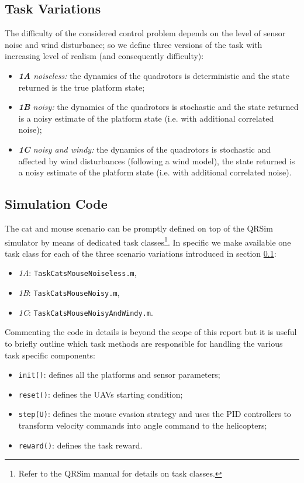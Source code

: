 \documentclass[a4paper,11pt]{report}
\newcommand{\sname}{QRSim\xspace}
\newcommand\mytexttt[1]{\texttt{\hyphenchar\font=45\relax #1}}
\begin{document}
\subsection{Task Variations} \label{CatMouseVariations}
The difficulty of the considered control problem depends on the level of sensor noise and wind disturbance; so we define three versions of the task with increasing level of realism (and consequently difficulty):
\begin{itemize}
 \item \textit{\textbf{1A} noiseless:} the dynamics of the quadrotors is deterministic and the state returned is the true platform state;
 \item \textit{\textbf{1B} noisy:} the dynamics of the quadrotors is stochastic and the state returned is a noisy estimate of the platform state (i.e. with additional correlated noise);
 \item \textit{\textbf{1C} noisy and windy:} the dynamics of the quadrotors is stochastic and affected by wind disturbances (following a wind model), the state returned is a noisy estimate of the platform state (i.e. with additional correlated noise).
\end{itemize}

\subsection{Simulation Code}\label{CatMouseSim}
The cat and mouse scenario can be promptly defined on top of the \sname simulator by means of dedicated task classes\footnote{Refer to the \sname manual for details on task classes.}. In specific we make available one task class for each of the three scenario variations introduced in section \ref{CatMouseVariations}:
\begin{itemize}
\item\textit{1A}: \mytexttt{TaskCatsMouseNoiseless.m},
\item\textit{1B}: \mytexttt{TaskCatsMouseNoisy.m},
\item\textit{1C}: \mytexttt{TaskCatsMouseNoisyAndWindy.m}. 
\end{itemize}

Commenting the code in details is beyond the scope of this report but it is useful to briefly outline which task methods are responsible for handling the various task specific components:
\begin{itemize}
\item\mytexttt{init()}: defines all the platforms and sensor parameters;
\item\mytexttt{reset()}: defines the UAVs starting condition;
\item\mytexttt{step(U)}: defines the mouse evasion strategy and uses the PID controllers to transform velocity commands into angle command to the helicopters;
\item\mytexttt{reward()}: defines the task reward.
\end{itemize}
\end{document}
